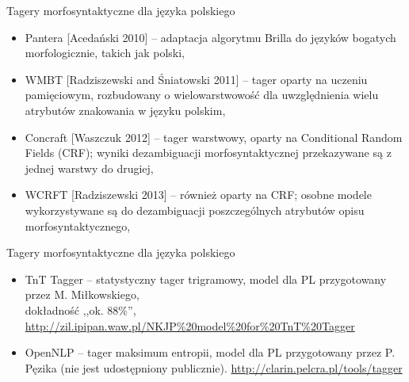\documentclass[xcolor=dvipsnames,polish]{beamer}
\begin{document}
\begin{frame}{Tagery morfosyntaktyczne dla języka polskiego}
\begin{itemize}
\item Pantera [Acedański 2010] -- adaptacja algorytmu Brilla do języków bogatych morfologicznie, takich jak polski,
\item WMBT [Radziszewski and Śniatowski 2011] -- tager oparty na uczeniu pamięciowym, rozbudowany o wielowarstwowość dla uwzględnienia wielu atrybutów znakowania w języku polskim,
\item Concraft [Waszczuk 2012] -- tager warstwowy, oparty na Conditional Random Fields (CRF); wyniki dezambiguacji morfosyntaktycznej przekazywane są z jednej warstwy do drugiej,
\item WCRFT [Radziszewski 2013] -- również oparty na CRF; osobne modele wykorzystywane są do dezambiguacji poszczególnych atrybutów opisu morfosyntaktycznego,
\end{itemize}
\end{frame}

\begin{frame}{Tagery morfosyntaktyczne dla języka polskiego}
\begin{itemize}
\item TnT Tagger -- statystyczny tager trigramowy, model dla PL przygotowany przez M. Miłkowskiego,\\
dokładność ,,ok. 88\%'',\\
{\footnotesize \url{http://zil.ipipan.waw.pl/NKJP\%20model\%20for\%20TnT\%20Tagger}}
\item OpenNLP -- tager maksimum entropii, model dla PL przygotowany przez P. Pęzika (nie jest udostępniony publicznie).
{\footnotesize \url{http://clarin.pelcra.pl/tools/tagger}}
\end{itemize}
\end{frame}
\end{document}
